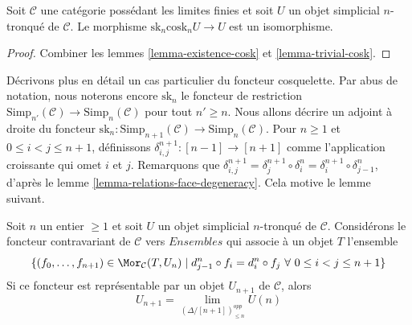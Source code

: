 \begin{lemma}
\label{lemma-recover-cosk}
Soit $\mathcal{C}$ une catégorie possédant les limites finies et soit
$U$ un objet simplicial $n$-tronqué de $\mathcal{C}$. Le morphisme
$\text{sk}_n \text{cosk}_n U \to U$ est un isomorphisme.
\end{lemma}

\begin{proof}
Combiner les lemmes \ref{lemma-existence-cosk} et
\ref{lemma-trivial-cosk}.
\end{proof}

\noindent
Décrivons plus en détail un cas particulier du foncteur cosquelette.
Par abus de notation, nous noterons encore $\text{sk}_n$ le foncteur de
restriction
$\text{Simp}_{n'}(\mathcal{C}) \to \text{Simp}_n(\mathcal{C})$
pour tout $n' \geq n$. Nous allons décrire un adjoint à droite du foncteur
$\text{sk}_n : \text{Simp}_{n + 1}(\mathcal{C})
\to \text{Simp}_n(\mathcal{C})$.
Pour $n \geq 1$ et $0 \leq i < j \leq n + 1$, définissons
$\delta^{n + 1}_{i, j} : [n - 1] \to [n + 1]$ comme l'application
croissante qui omet $i$ et $j$. Remarquons que
$\delta^{n + 1}_{i, j} =
\delta^{n + 1}_j \circ \delta^n_i =
\delta^{n + 1}_i \circ \delta^n_{j - 1}$,
d'après le lemme \ref{lemma-relations-face-degeneracy}. Cela motive le
lemme suivant.

\begin{lemma}
\label{lemma-formula-limit}
Soit $n$ un entier $\geq 1$ et soit $U$ un objet simplicial $n$-tronqué
de $\mathcal{C}$. Considérons le foncteur contravariant de $\mathcal{C}$
vers $\textit{Ensembles}$ qui associe à un objet $T$ l'ensemble
$$
\{ (f_0, \ldots, f_{n + 1}) \in \Mor_\mathcal{C}(T, U_n)
\mid
d^n_{j - 1} \circ f_i = d^n_i \circ f_j
\ \forall\ 0\leq i < j\leq n + 1\}
$$
Si ce foncteur est représentable par un objet $U_{n + 1}$ de
$\mathcal{C}$, alors
$$
U_{n + 1} = \lim_{(\Delta/[n + 1])_{\leq n}^{opp}} U(n)
$$
\end{lemma}

